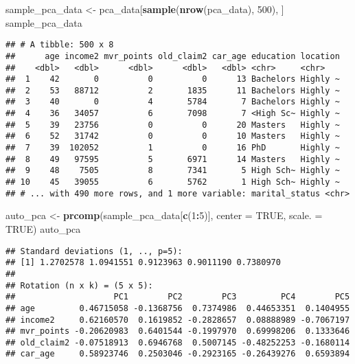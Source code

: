 \documentclass[]{article}
\newenvironment{Shaded}{\begin{snugshade}}{\end{snugshade}}
\newcommand{\KeywordTok}[1]{\textcolor[rgb]{0.13,0.29,0.53}{\textbf{#1}}}
\newcommand{\DataTypeTok}[1]{\textcolor[rgb]{0.13,0.29,0.53}{#1}}
\newcommand{\DecValTok}[1]{\textcolor[rgb]{0.00,0.00,0.81}{#1}}
\newcommand{\StringTok}[1]{\textcolor[rgb]{0.31,0.60,0.02}{#1}}
\newcommand{\OtherTok}[1]{\textcolor[rgb]{0.56,0.35,0.01}{#1}}
\newcommand{\OperatorTok}[1]{\textcolor[rgb]{0.81,0.36,0.00}{\textbf{#1}}}
\newcommand{\NormalTok}[1]{#1}
\begin{document}
\begin{Shaded}
\begin{Highlighting}[]
\NormalTok{sample_pca_data <-}\StringTok{ }\NormalTok{pca_data[}\KeywordTok{sample}\NormalTok{(}\KeywordTok{nrow}\NormalTok{(pca_data), }\DecValTok{500}\NormalTok{), ]}
\NormalTok{sample_pca_data}
\end{Highlighting}
\end{Shaded}

\begin{verbatim}
## # A tibble: 500 x 8
##      age income2 mvr_points old_claim2 car_age education location
##    <dbl>   <dbl>      <dbl>      <dbl>   <dbl> <chr>     <chr>   
##  1    42       0          0          0      13 Bachelors Highly ~
##  2    53   88712          2       1835      11 Bachelors Highly ~
##  3    40       0          4       5784       7 Bachelors Highly ~
##  4    36   34057          6       7098       7 <High Sc~ Highly ~
##  5    39   23756          0          0      20 Masters   Highly ~
##  6    52   31742          0          0      10 Masters   Highly ~
##  7    39  102052          1          0      16 PhD       Highly ~
##  8    49   97595          5       6971      14 Masters   Highly ~
##  9    48    7505          8       7341       5 High Sch~ Highly ~
## 10    45   39055          6       5762       1 High Sch~ Highly ~
## # ... with 490 more rows, and 1 more variable: marital_status <chr>
\end{verbatim}

\begin{Shaded}
\begin{Highlighting}[]
\NormalTok{auto_pca <-}\StringTok{ }\KeywordTok{prcomp}\NormalTok{(sample_pca_data[}\KeywordTok{c}\NormalTok{(}\DecValTok{1}\OperatorTok{:}\DecValTok{5}\NormalTok{)], }\DataTypeTok{center =} \OtherTok{TRUE}\NormalTok{, }\DataTypeTok{scale. =} \OtherTok{TRUE}\NormalTok{)}
\NormalTok{auto_pca}
\end{Highlighting}
\end{Shaded}

\begin{verbatim}
## Standard deviations (1, .., p=5):
## [1] 1.2702578 1.0941551 0.9123963 0.9011190 0.7380970
## 
## Rotation (n x k) = (5 x 5):
##                    PC1        PC2        PC3         PC4        PC5
## age         0.46715058 -0.1368756  0.7374986  0.44653351  0.1404955
## income2     0.62160570  0.1619852 -0.2828657  0.08888989 -0.7067197
## mvr_points -0.20620983  0.6401544 -0.1997970  0.69998206  0.1333646
## old_claim2 -0.07518913  0.6946768  0.5007145 -0.48252253 -0.1680114
## car_age     0.58923746  0.2503046 -0.2923165 -0.26439276  0.6593894
\end{verbatim}
\end{document}

